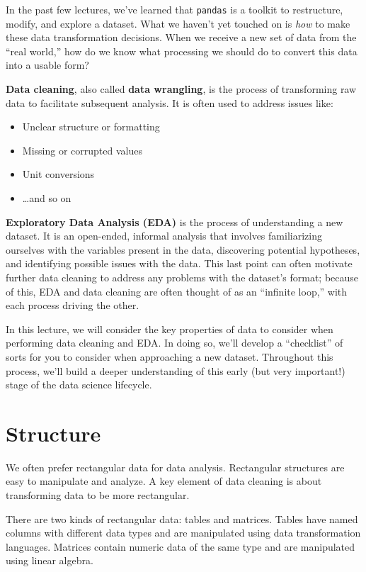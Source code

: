 \documentclass[
  letterpaper,
  DIV=11,
  numbers=noendperiod]{scrreprt}
\providecommand{\tightlist}{%
  \setlength{\itemsep}{0pt}\setlength{\parskip}{0pt}}\usepackage{longtable,booktabs,array}
\begin{document}
In the past few lectures, we've learned that \texttt{pandas} is a
toolkit to restructure, modify, and explore a dataset. What we haven't
yet touched on is \emph{how} to make these data transformation
decisions. When we receive a new set of data from the ``real world,''
how do we know what processing we should do to convert this data into a
usable form?

\textbf{Data cleaning}, also called \textbf{data wrangling}, is the
process of transforming raw data to facilitate subsequent analysis. It
is often used to address issues like:

\begin{itemize}
\tightlist
\item
  Unclear structure or formatting
\item
  Missing or corrupted values
\item
  Unit conversions
\item
  \ldots and so on
\end{itemize}

\textbf{Exploratory Data Analysis (EDA)} is the process of understanding
a new dataset. It is an open-ended, informal analysis that involves
familiarizing ourselves with the variables present in the data,
discovering potential hypotheses, and identifying possible issues with
the data. This last point can often motivate further data cleaning to
address any problems with the dataset's format; because of this, EDA and
data cleaning are often thought of as an ``infinite loop,'' with each
process driving the other.

In this lecture, we will consider the key properties of data to consider
when performing data cleaning and EDA. In doing so, we'll develop a
``checklist'' of sorts for you to consider when approaching a new
dataset. Throughout this process, we'll build a deeper understanding of
this early (but very important!) stage of the data science lifecycle.

\hypertarget{structure}{%
\section{Structure}\label{structure}}

We often prefer rectangular data for data analysis. Rectangular
structures are easy to manipulate and analyze. A key element of data
cleaning is about transforming data to be more rectangular.

There are two kinds of rectangular data: tables and matrices. Tables
have named columns with different data types and are manipulated using
data transformation languages. Matrices contain numeric data of the same
type and are manipulated using linear algebra.
\end{document}
